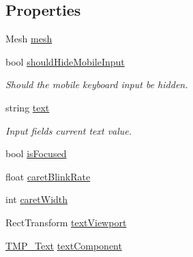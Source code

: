 \subsection*{Properties}
\begin{DoxyCompactItemize}
\item 
Mesh \mbox{\hyperlink{class_t_m_pro_1_1_t_m_p___input_field_ad3640613447de8014aa5cbbb8230dbd2}{mesh}}
\item 
bool \mbox{\hyperlink{class_t_m_pro_1_1_t_m_p___input_field_aef653449d7af3f273835cd4bcbcc6b16}{should\+Hide\+Mobile\+Input}}
\begin{DoxyCompactList}\small\item\em Should the mobile keyboard input be hidden. \end{DoxyCompactList}\item 
string \mbox{\hyperlink{class_t_m_pro_1_1_t_m_p___input_field_ab89ad02ff00c4c076c5bd3303528e5de}{text}}
\begin{DoxyCompactList}\small\item\em Input field\textquotesingle{}s current text value. \end{DoxyCompactList}\item 
bool \mbox{\hyperlink{class_t_m_pro_1_1_t_m_p___input_field_ad0adb2aaa39a20d28250502e300708a1}{is\+Focused}}
\item 
float \mbox{\hyperlink{class_t_m_pro_1_1_t_m_p___input_field_a189bdcef8ba63cfdb87663d7eda77ac5}{caret\+Blink\+Rate}}
\item 
int \mbox{\hyperlink{class_t_m_pro_1_1_t_m_p___input_field_a62dfe3f69bf1f6afa3f8d9202af93765}{caret\+Width}}
\item 
Rect\+Transform \mbox{\hyperlink{class_t_m_pro_1_1_t_m_p___input_field_aa426bf08e2a529483205e898eafa3270}{text\+Viewport}}
\item 
\mbox{\hyperlink{class_t_m_pro_1_1_t_m_p___text}{T\+M\+P\+\_\+\+Text}} \mbox{\hyperlink{class_t_m_pro_1_1_t_m_p___input_field_a53ff62868818b04e9a143824d281a4a1}{text\+Component}}

\end{DoxyCompactItemize}
